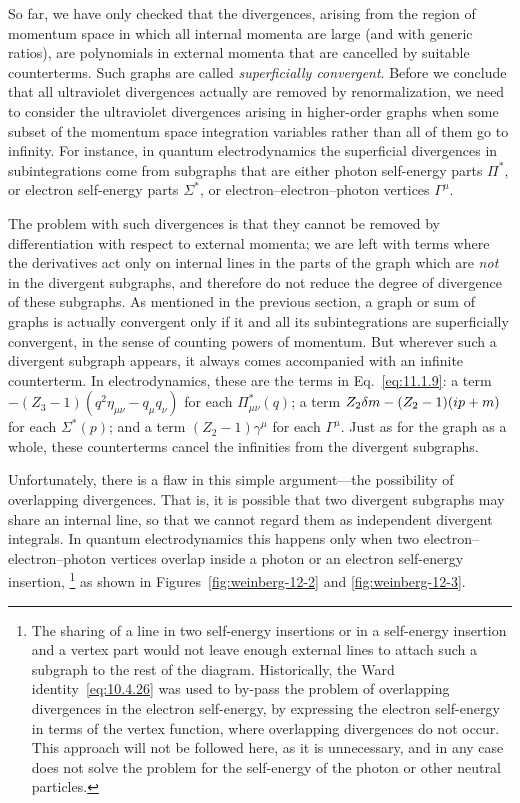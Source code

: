 So far, we have only checked that the divergences, arising from the region
of momentum space in which all internal momenta are large (and with generic
ratios), are polynomials in external momenta that are cancelled by suitable
counterterms. Such graphs are called \emph{superficially convergent}. Before
we conclude that all ultraviolet divergences actually are removed by
renormalization, we need to consider the ultraviolet divergences arising in
higher-order graphs when some subset of the momentum space integration
variables rather than all of them go to infinity. For instance, in quantum
electrodynamics the superficial divergences in subintegrations come from
subgraphs that are either photon self-energy parts $\Pi^*$, or electron
self-energy parts $\Sigma^*$, or electron--electron--photon vertices
$\Gamma^\mu$.



The problem with such divergences is that they cannot be removed by
differentiation with respect to external momenta; we are left with terms
where the derivatives act only on internal lines in the parts of the graph
which are \emph{not} in the divergent subgraphs, and therefore do not reduce
the degree of divergence of these subgraphs. As mentioned in the previous
section, a graph or sum of graphs is actually convergent only if it and all
its subintegrations are superficially convergent, in the sense of counting
powers of momentum. But wherever such a divergent subgraph appears, it
always comes accompanied with an infinite counterterm. In electrodynamics,
these are the terms in Eq.~\eqref{eq:11.1.9}: a term
$-(Z_3-1)(q^2\eta_{\mu\nu}-q_\mu q_\nu)$ for each $\Pi_{\mu\nu}^*(q)$; a
term $Z_2\delta m-(Z_2-1)(i\sl{p}+m)$ for each $\Sigma^*(p)$; and a term
$(Z_2-1)\gamma^\mu$ for each $\Gamma^\mu$. Just as for the graph as a whole,
these counterterms cancel the infinities from the divergent subgraphs.

Unfortunately, there is a flaw in this simple argument---the possibility of
overlapping divergences. That is, it is possible that two divergent subgraphs
may share an internal line, so that we cannot regard them as independent
divergent integrals. In quantum electrodynamics this happens only when two
electron--electron--photon vertices overlap inside a photon or an electron
self-energy insertion,
\footnote{The sharing of a line in two self-energy insertions or in a
self-energy insertion and a vertex part would not leave enough external
lines to attach such a subgraph to the rest of the diagram. Historically,
the Ward identity~\eqref{eq:10.4.26} was used to by-pass the problem of overlapping
divergences in the electron self-energy, by expressing the electron
self-energy in terms of the vertex function, where overlapping divergences
do not occur. This approach will not be followed here, as it is unnecessary,
and in any case does not solve the problem for the self-energy of the photon
or other neutral particles.}
as shown in Figures~\ref{fig:weinberg-12-2} and \ref{fig:weinberg-12-3}.

